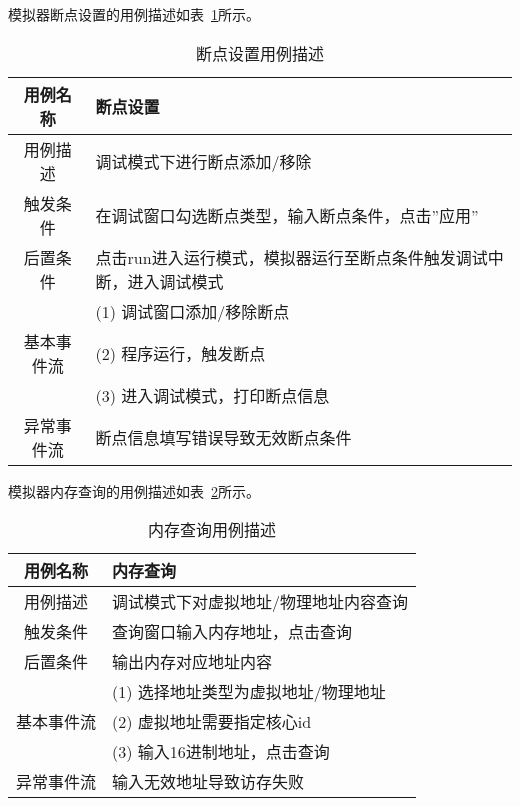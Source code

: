 模拟器断点设置的用例描述如表~\ref{tab:yongli3}所示。
\begin{table}[H]
  \centering
  \caption{断点设置用例描述}
  \label{tab:yongli3}
  \renewcommand\arraystretch{1.1}
  \begin{tabular}{cl}
    \toprule
用例名称	& 断点设置\\
    \midrule
用例描述	& \multicolumn{1}{p{9cm}}{调试模式下进行断点添加/移除}\\ \hline
触发条件	& \multicolumn{1}{m{9cm}}{在调试窗口勾选断点类型，输入断点条件，点击”应用”}\\ \hline
后置条件	& \multicolumn{1}{m{9cm}}{点击run进入运行模式，模拟器运行至断点条件触发调试中断，进入调试模式}\\ \hline
 & \multicolumn{1}{m{9cm}}{(1)	调试窗口添加/移除断点}\\
 基本事件流 & \multicolumn{1}{m{9cm}}{(2)	程序运行，触发断点}\\
 & \multicolumn{1}{m{9cm}}{(3)	进入调试模式，打印断点信息}\\ \hline
异常事件流	& \multicolumn{1}{m{9cm}}{断点信息填写错误导致无效断点条件}\\
    \bottomrule
  \end{tabular}
\end{table}


模拟器内存查询的用例描述如表~\ref{tab:yongli4}所示。
\begin{table}[H]
  \centering
  \caption{内存查询用例描述}
  \label{tab:yongli4}
  \renewcommand\arraystretch{1.1}
  \begin{tabular}{cl}
    \toprule
用例名称	& 内存查询\\
    \midrule
用例描述	& 调试模式下对虚拟地址/物理地址内容查询\\ \hline
触发条件	& 查询窗口输入内存地址，点击查询\\ \hline
后置条件	& 输出内存对应地址内容\\ \hline
	& (1) 选择地址类型为虚拟地址/物理地址\\
  基本事件流 &            (2) 虚拟地址需要指定核心id\\
 &            (3) 输入16进制地址，点击查询\\ \hline
异常事件流	& 输入无效地址导致访存失败\\
    \bottomrule
  \end{tabular}
\end{table}


